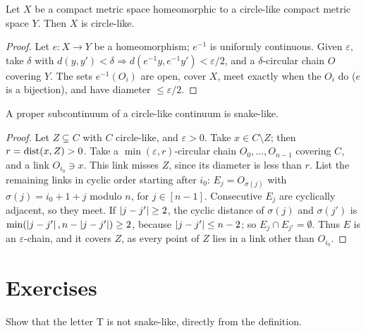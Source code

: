 
\begin{proposition}\label{prop:circle-homeo}
Let $X$ be a compact metric space homeomorphic to a circle-like compact metric space $Y$. Then $X$ is
circle-like.
\end{proposition}

\begin{proof}
Let $e\colon X\to Y$ be a homeomorphism; $e^{-1}$ is uniformly continuous. Given $\varepsilon$, take
$\delta$ with $d(y,y')<\delta\Rightarrow d(e^{-1}y,e^{-1}y')<\varepsilon/2$, and a $\delta$-circular
chain $O$ covering $Y$. The sets $e^{-1}(O_i)$ are open, cover $X$, meet exactly when the $O_i$ do
($e$ is a bijection), and have diameter $\le\varepsilon/2$.
\end{proof}


\begin{theorem}\label{thm:circle-sub}
A proper subcontinuum of a circle-like continuum is snake-like.
\end{theorem}

\begin{proof}
Let $Z\subsetneq C$ with $C$ circle-like, and $\varepsilon>0$. Take $x\in C\setminus Z$; then
$r=\operatorname{dist}(x,Z)>0$. Take a $\min(\varepsilon,r)$-circular chain $O_0,\dots,O_{n-1}$ covering $C$, and a link
$O_{i_0}\ni x$. This link misses $Z$, since its diameter is less than $r$. List the remaining links in
cyclic order starting after $i_0$: $E_j=O_{\sigma(j)}$ with $\sigma(j)=i_0+1+j$ modulo $n$, for
$j\in[n-1]$. Consecutive $E_j$ are cyclically adjacent, so they meet. If $\left\lvert j-j'\right\rvert\ge2$, the cyclic
distance of $\sigma(j)$ and $\sigma(j')$ is $\min(\left\lvert j-j'\right\rvert,n-\left\lvert j-j'\right\rvert)\ge2$, because
$\left\lvert j-j'\right\rvert\le n-2$; so $E_j\cap E_{j'}=\emptyset$. Thus $E$ is an $\varepsilon$-chain, and it covers $Z$,
as every point of $Z$ lies in a link other than $O_{i_0}$.
\end{proof}


\section*{Exercises}

\begin{exercise}
Show that the letter T is not snake-like, directly from the definition.
\end{exercise}


